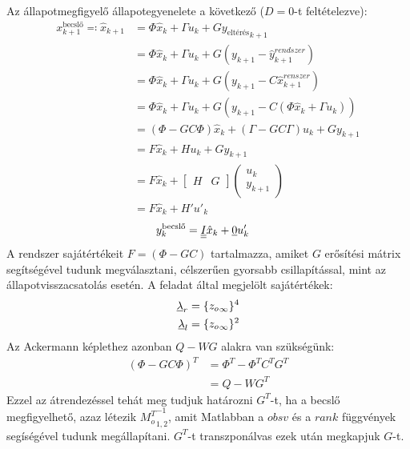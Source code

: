\documentclass{article}
\begin{document}
    Az állapotmegfigyelő állapotegyenelete a következő ($D = 0$-t feltételezve):
    \begin{align}
        x_{k+1}^{\textrm{becslő}} \eqqcolon \hat{x}_{k+1} & = \Phi \hat{x}_k + \Gamma u_k + G { { y_{\textrm{eltérés}} }_{k+1} } \\
        & = \Phi \hat{x}_k + \Gamma u_k + G(y_{k+1} - \hat{y}_{k+1}^{rendszer}) \\
        & = \Phi \hat{x}_k + \Gamma u_k + G(y_{k+1} - C\hat{x}_{k+1}^{renszer}) \\
        & = \Phi \hat{x}_k + \Gamma u_k + G(y_{k+1} - C(\Phi \hat{x}_k + \Gamma u_k)) \\
        & = (\Phi - GC\Phi)\hat{x}_k + (\Gamma - GC\Gamma) u_k + Gy_{k+1} \\
        & = F\hat{x}_k + Hu_k + Gy_{k+1} \\
        & = F\hat{x}_k + 
        \begin{bmatrix}
            H & G
        \end{bmatrix}
        \begin{pmatrix}
            u_k \\
            y_{k+1}
        \end{pmatrix} \\
        & = F \hat{x}_k + H'u'_k
    \end{align}
    \begin{align}
        y_k^{\textrm{becslő}} & = \underline{\underline{I}} \hat{x}_k + \underline{0} u'_k
    \end{align}
    A rendszer sajátértékeit $F = (\Phi - GC)$ tartalmazza, amiket $G$ erősítési mátrix segítségével tudunk megválasztani, célszerűen gyorsabb csillapítással, mint az állapotvisszacsatolás esetén. A feladat által megjelölt sajátértékek:
    \begin{align}
		\underline{\lambda}_r & = \{{{z_o}_{\infty}}\}^4 \\
		\underline{\lambda}_l & = \{{{z_o}_{\infty}}\}^2 
    \end{align}
    Az Ackermann képlethez azonban $Q - WG$ alakra van szükségünk:
    \begin{align}
        (\Phi - GC\Phi)^T & = \Phi^T - \Phi^T C^T G^T \\
        & = Q - WG^T
    \end{align}
    Ezzel az átrendezéssel tehát meg tudjuk határozni $G^T$-t, ha a becslő megfigyelhető, azaz létezik ${M_o^T}_{1,2}^{-1}$, amit Matlabban a $obsv$ és a $rank$ függvények segíségével tudunk megállapítani. $G^T$-t transzponálvas ezek után megkapjuk $G$-t.  
\end{document}
